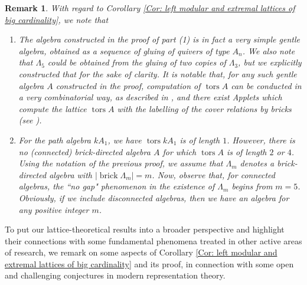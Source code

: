 \documentclass{amsart}
\theoremstyle{thmstyle}
\theoremstyle{exstyle}
\theoremstyle{defstyle}
\theoremstyle{remstyle}
\newtheorem{remark}[thm]{Remark}
\theoremstyle{remstyle}
\DeclareMathOperator*{\brick}{brick}
\DeclareMathOperator*{\tors}{tors}
\begin{document}
\begin{remark}
With regard to Corollary \ref{Cor: left modular and extremal lattices of big cardinality}, we note that
\begin{enumerate}
    \item The algebra constructed in the proof of part (1) is in fact a very simple gentle algebra, obtained as a sequence of gluing of quivers of type $A_n$. We also note that $\Lambda_5$ could be obtained from the gluing of two copies of $\Lambda_3$, but we explicitly constructed that for the sake of clarity. 
    It is notable that, for any such gentle algebra $A$ constructed in the proof, computation of $\tors A$ can be conducted in a very combinatorial way, as described in \cite{BD+}, and there exist Applets which compute the lattice $\tors A$ with the labelling of the cover relations by bricks (see \cite{En, Ge}).
    
    \item For the path algebra $kA_1$, we have $\tors kA_1$ is of length $1$. However, there is no (connected) brick-directed algebra $A$ for which $\tors A$ is of length $2$ or $4$. 
    Using the notation of the previous proof, we assume that $\Lambda_m$ denotes a brick-directed algebra with $|\brick \Lambda_m|=m$. 
    Now, observe that, for connected algebras, the ``no gap" phenomenon in the existence of $\Lambda_m$ begins from $m=5$. 
    Obviously, if we include disconnected algebras, then we have an algebra for any positive integer $m$.
    \end{enumerate}
\end{remark}

To put our lattice-theoretical results into a broader perspective and highlight their connections with some fundamental phenomena treated in other active areas of research, we remark on some aspects of Corollary \ref{Cor: left modular and extremal lattices of big cardinality} and its proof, in connection with some open and challenging conjectures in modern representation theory.
 
\end{document}
